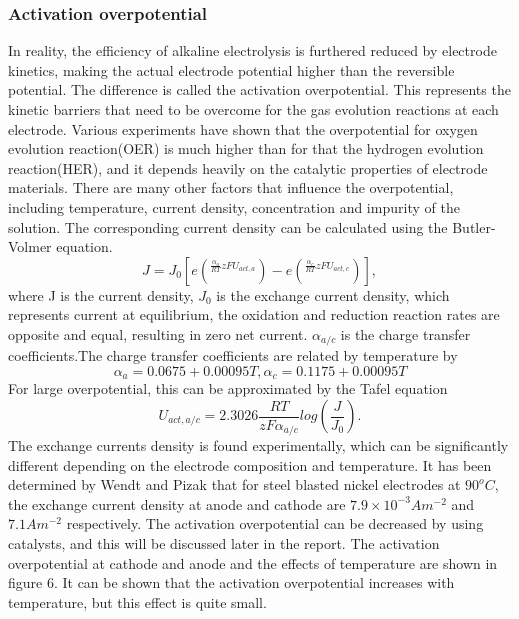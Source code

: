 \subsubsection{Activation overpotential}
In reality, the efficiency of alkaline electrolysis is furthered reduced by electrode kinetics, making the actual electrode potential higher than the reversible potential. The difference is called the activation overpotential. This represents the kinetic barriers that need to be overcome for the gas evolution reactions at each electrode. Various experiments have shown that the overpotential for oxygen evolution reaction(OER) is much higher than for that the hydrogen evolution reaction(HER), and it depends heavily on the catalytic properties of electrode materials. \cite{activation} There are many other factors that influence the overpotential, including temperature, current density, concentration and impurity of the solution.
The corresponding current density can be calculated using the Butler-Volmer equation.\cite{activation1}
\begin{equation} 
J = J_0 [e(^{\frac{\alpha_a}{RT}zFU_{act,a}}) - e(^{\frac{\alpha_c}{RT}zFU_{act,c}})],
\end{equation}
where J is the current density, $J_0$ is the exchange current density, which represents current at equilibrium, the oxidation and reduction reaction rates are opposite and equal, resulting in zero net current.  $\alpha_{a/c}$ is the charge transfer coefficients.The charge transfer coefficients are related by temperature by
\begin{equation} 
\alpha_a = 0.0675 + 0.00095T, \alpha_c = 0.1175+0.00095T
\end{equation} 
For large overpotential, this can be approximated by the Tafel equation\cite{activation2} 
\begin{equation} 
U_{act,a/c} = 2.3026 \frac{RT}{zF\alpha_{a/c}} log(\frac{J}{J_0}).
\end{equation}
The exchange currents density is found experimentally, which can be significantly different depending on the electrode composition and temperature. It has been determined by Wendt and Pizak that for steel blasted nickel electrodes at $90^oC$, the exchange current density at anode and cathode are $7.9 \times10^{-3}Am^{-2}$ and $7.1Am^{-2}$ respectively. \cite{activation3} The activation overpotential can be decreased by using catalysts, and this will be discussed later in the report. The activation overpotential at cathode and anode and the effects of temperature are shown in figure 6. It can be shown that the activation overpotential increases with temperature, but this effect is quite small.
